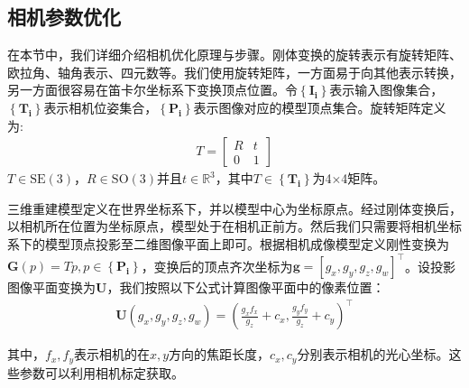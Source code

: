 \subsection{相机参数优化}
在本节中，我们详细介绍相机优化原理与步骤。刚体变换的旋转表示有旋转矩阵、欧拉角、轴角表示、四元数等。我们使用旋转矩阵，一方面易于向其他表示转换，另一方面很容易在笛卡尔坐标系下变换顶点位置。令$ \left \{ \mathbf{I_i} \right \} $表示输入图像集合，$\left \{ \mathbf{T_i} \right \}$表示相机位姿集合，$\left \{ \mathbf{P_i} \right \}$表示图像对应的模型顶点集合。旋转矩阵定义为:
\begin{align}
	T = \left[\begin{array}{cc}
		R & t \\
		0 & 1
	\end{array}\right]
\end{align}
$T \in \mathrm{SE} (3)$，$R \in \mathrm{SO}(3)$并且$t\in\mathbb{R}^3$，其中$T \in \left \{ \mathbf{T_i} \right \}$为4$\times$4矩阵。\par 
三维重建模型定义在世界坐标系下，并以模型中心为坐标原点。经过刚体变换后，以相机所在位置为坐标原点，模型处于在相机正前方。然后我们只需要将相机坐标系下的模型顶点投影至二维图像平面上即可。根据相机成像模型定义刚性变换为$\mathbf{G}(p)=Tp, p \in \left \{ \mathbf{P_i} \right \}$，变换后的顶点齐次坐标为$\mathbf{g}=[g_x, g_y, g_z,g_w]^\top$。设投影图像平面变换为$\mathbf{U}$，我们按照以下公式计算图像平面中的像素位置：
\begin{align}
\mathbf{U}\left(g_{x}, g_{y}, g_{z}, g_{w}\right)=\left(\frac{g_{x} f_{x}}{g_{z}}+c_{x}, \frac{g_{y} f_{y}}{g_{z}}+c_{y}\right)^{\top}
\end{align}

其中，$f_x,f_y$表示相机的在$x,y$方向的焦距长度，$c_x,c_y$分别表示相机的光心坐标。这些参数可以利用相机标定获取。\par

